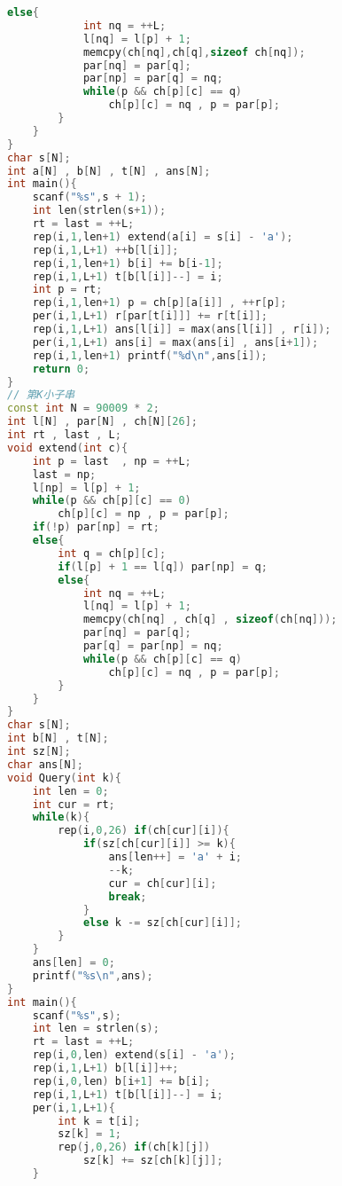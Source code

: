\begin{lstlisting}[language=C++]
        else{
            int nq = ++L;
            l[nq] = l[p] + 1;
            memcpy(ch[nq],ch[q],sizeof ch[nq]);
            par[nq] = par[q];
            par[np] = par[q] = nq;
            while(p && ch[p][c] == q)
                ch[p][c] = nq , p = par[p];
        }
    }
}
char s[N];
int a[N] , b[N] , t[N] , ans[N];
int main(){
    scanf("%s",s + 1);
    int len(strlen(s+1));
    rt = last = ++L;
    rep(i,1,len+1) extend(a[i] = s[i] - 'a');
    rep(i,1,L+1) ++b[l[i]];
    rep(i,1,len+1) b[i] += b[i-1];
    rep(i,1,L+1) t[b[l[i]]--] = i;
    int p = rt;
    rep(i,1,len+1) p = ch[p][a[i]] , ++r[p];
    per(i,1,L+1) r[par[t[i]]] += r[t[i]];
    rep(i,1,L+1) ans[l[i]] = max(ans[l[i]] , r[i]);
    per(i,1,L+1) ans[i] = max(ans[i] , ans[i+1]);
    rep(i,1,len+1) printf("%d\n",ans[i]);
    return 0;
}
// 第K小子串
const int N = 90009 * 2;
int l[N] , par[N] , ch[N][26];
int rt , last , L;
void extend(int c){
    int p = last  , np = ++L;
    last = np;
    l[np] = l[p] + 1;
    while(p && ch[p][c] == 0)
        ch[p][c] = np , p = par[p];
    if(!p) par[np] = rt;
    else{
        int q = ch[p][c];
        if(l[p] + 1 == l[q]) par[np] = q;
        else{
            int nq = ++L;
            l[nq] = l[p] + 1;
            memcpy(ch[nq] , ch[q] , sizeof(ch[nq]));
            par[nq] = par[q];
            par[q] = par[np] = nq;
            while(p && ch[p][c] == q)
                ch[p][c] = nq , p = par[p];
        }
    }
}
char s[N];
int b[N] , t[N];
int sz[N];
char ans[N];
void Query(int k){
    int len = 0;
    int cur = rt;
    while(k){
        rep(i,0,26) if(ch[cur][i]){
            if(sz[ch[cur][i]] >= k){
                ans[len++] = 'a' + i;
                --k;
                cur = ch[cur][i];
                break;
            }
            else k -= sz[ch[cur][i]];
        }
    }
    ans[len] = 0;
    printf("%s\n",ans);
}
int main(){
    scanf("%s",s);
    int len = strlen(s);
    rt = last = ++L;
    rep(i,0,len) extend(s[i] - 'a');
    rep(i,1,L+1) b[l[i]]++;
    rep(i,0,len) b[i+1] += b[i];
    rep(i,1,L+1) t[b[l[i]]--] = i;
    per(i,1,L+1){
        int k = t[i];
        sz[k] = 1;
        rep(j,0,26) if(ch[k][j])
            sz[k] += sz[ch[k][j]];
    }



\end{lstlisting}
